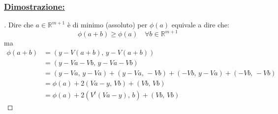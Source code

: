 \documentclass[12pt,a4paper]{article}
\begin{document}
\subsubsection{\uline{Dimostrazione:}}
\begin{proof}[\unskip\nopunct]
Dire che $a \in \mathbb{R}^{m+1}$ è di minimo (assoluto) per $\phi(a)$ equivale a dire che:
\[
	\phi(a+b) \geq \phi(a) \quad \forall b \in \mathbb{R}^{m+1}
\]
ma
\begin{align*}
    \phi(a+b) & = (y-V(a+b),\, y-V(a+b)) \\
    & = (y-Va-Vb, \, y-Va-Vb) \\
    & = (y-Va,\, y-Va) + (y-Va, \, -Vb) + (-Vb, \, y-Va) + (-Vb, \, -Vb)\\
    & = \phi(a) + 2(Va-y, \, Vb) + (Vb, \, Vb) \\
    & = \phi(a) +2(V^t(Va-y), \, b) + (Vb, \, Vb)
\end{align*}


\end{proof}
\end{document}
